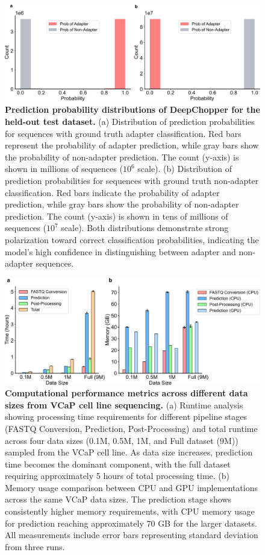 \documentclass[pdflatex,sn-nature, lineno]{sn-jnl}%
\begin{document}
\begin{figure}[!ht]
    \includegraphics[height=0.35\columnwidth]{finals/adaprob}
    \caption{{\bf Prediction probability distributions of DeepChopper for the held-out test dataset.} (a) Distribution of prediction probabilities for sequences with ground truth adapter classification. Red bars represent the probability of adapter prediction, while gray bars show the probability of non-adapter prediction. The count (y-axis) is shown in millions of sequences ($10^6$ scale). (b) Distribution of prediction probabilities for sequences with ground truth non-adapter classification. Red bars indicate the probability of adapter prediction, while gray bars show the probability of non-adapter prediction. The count (y-axis) is shown in tens of millions of sequences ($10^7$ scale). Both distributions demonstrate strong polarization toward correct classification probabilities, indicating the model's high confidence in distinguishing between adapter and non-adapter sequences.
    }\label{fig:adaprob}
\end{figure}

\begin{figure}[!ht]
    \includegraphics[height=0.4\columnwidth]{finals/sf2a}
    \caption{ {\bf Computational performance metrics across different data sizes from VCaP cell line sequencing.} (a) Runtime analysis showing processing time requirements for different pipeline stages (FASTQ Conversion, Prediction, Post-Processing) and total runtime across four data sizes (0.1M, 0.5M, 1M, and Full dataset (9M)) sampled from the VCaP cell line. As data size increases, prediction time becomes the dominant component, with the full dataset requiring approximately 5 hours of total processing time. (b) Memory usage comparison between CPU and GPU implementations across the same VCaP data sizes. The prediction stage shows consistently higher memory requirements, with CPU memory usage for prediction reaching approximately 70 GB for the larger datasets. All measurements include error bars representing standard deviation from three runs.}\label{fig:sf2a}
\end{figure}
\end{document}

